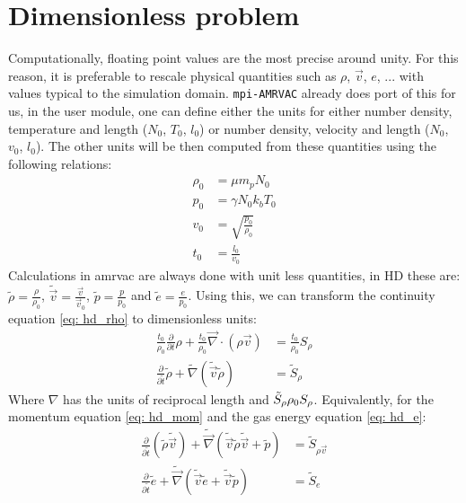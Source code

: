 \section{Dimensionless problem}
Computationally, floating point values are the most precise around unity. For this reason, it is preferable to rescale physical quantities such as $\rho$, $\vec{v}$, $e$, ... with values typical to the simulation domain. \texttt{mpi-AMRVAC} already does port of this for us, in the user module, one can define either the units for either number density, temperature  and length ($N_0$, $T_0$, $l_0$) or  number density, velocity  and length ($N_0$, $v_0$, $l_0$). The other units will be then computed from these quantities using the following relations:
\begin{align}
\rho_0 &= \mu m_p N_0 \\
   p_0 &= \gamma N_0 k_b T_0 \\
   v_0 &= \sqrt{\frac{p_0}{\rho_0}} \\
   t_0 &= \frac{l_0}{v_0}
\end{align}
Calculations in amrvac are always done with unit less quantities, in HD these are: $\tilde{\rho} = \frac{\rho}{\rho_0}$, $\tilde{\vec{v}} = \frac{\vec{v}}{\vec{v}_0}$, $\tilde{p} = \frac{p}{p_0}$ and $\tilde{e} = \frac{e}{p_0}$. Using this, we can transform the continuity equation \eqref{eq: hd_rho} to dimensionless units:
\begin{align}
\frac{t_0}{\rho_0} \frac{\partial}{\partial t} \rho  + \frac{t_0}{\rho_0} \vec{\nabla} \cdot \left( \rho \vec{v}  \right) &= \frac{t_0}{\rho_0} S_\rho \\
\frac{\partial}{\partial \tilde{t}} \tilde{\rho} + \tilde{\nabla} \left( \tilde{\vec{v}} \tilde{\rho} \right) &= \tilde{S}_\rho
\end{align}
Where $\nabla$ has the units of reciprocal length and $\tilde{S}_\rho \def \frac{t_0}{\rho_0} S_\rho$. Equivalently, for the momentum equation \eqref{eq: hd_mom} and the gas energy equation \eqref{eq: hd_e}:
\begin{align}
\frac{\partial}{\partial \tilde{t}} \left(\tilde{\rho} \tilde{\vec{v}} \right) + \tilde{\vec{\nabla}} \left(\tilde{\vec{v}} \tilde{\rho}  \tilde{\vec{v}} + \tilde{p} \right) &= \tilde{S}_{\rho \vec{v}} \\
\frac{\partial}{\partial \tilde{t}} \tilde{e} + \tilde{\vec{\nabla}} \left(\tilde{\vec{v}} \tilde{e} + \tilde{\vec{v}} \tilde{p} \right) &= \tilde{S}_e \\
\end{align}
